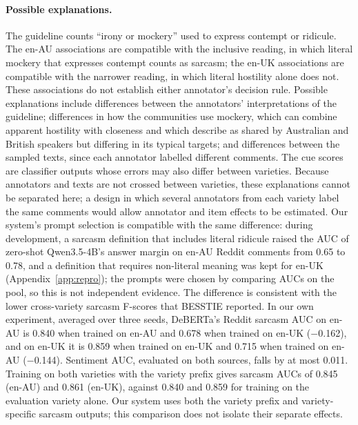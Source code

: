\documentclass[11pt]{article}
\begin{document}
\paragraph{Possible explanations.} The guideline counts ``irony or mockery'' used to express contempt or ridicule. The
en-AU associations are compatible with the inclusive reading, in which literal mockery that expresses contempt counts as
sarcasm; the en-UK associations are compatible with the narrower reading, in which literal hostility alone does not.
These associations do not establish either annotator's decision rule. Possible explanations include differences between
the annotators' interpretations of the guideline; differences in how the communities use mockery, which can combine
apparent hostility with closeness and which \citet{haugh2012mock} describe as shared by Australian and British speakers
but differing in its typical targets; and differences between the sampled texts, since each
annotator labelled different comments. The cue scores are classifier outputs whose errors may also differ between
varieties. Because annotators and texts are not crossed between varieties, these explanations cannot be separated here;
a design in which several annotators from each variety label the same comments would allow annotator and item effects
to be estimated. Our system's prompt selection is compatible with the same difference: during development, a sarcasm
definition that includes literal ridicule raised the AUC of zero-shot Qwen3.5-4B's answer margin on en-AU Reddit
comments from 0.65 to 0.78, and a definition that requires non-literal meaning was kept for en-UK
(Appendix~\ref{app:repro}); the prompts were chosen by comparing AUCs on the pool, so this is not independent evidence. The difference is consistent with the lower cross-variety sarcasm
F-scores that BESSTIE reported. In our own experiment, averaged over three seeds, DeBERTa's Reddit sarcasm AUC on
en-AU is 0.840 when trained on en-AU and 0.678 when trained on en-UK ($-$0.162), and on en-UK it is 0.859 when trained
on en-UK and 0.715 when trained on en-AU ($-$0.144). Sentiment AUC, evaluated on both sources, falls by at most 0.011.
Training on both varieties with the variety prefix gives sarcasm AUCs of 0.845 (en-AU) and 0.861 (en-UK), against 0.840
and 0.859 for training on the evaluation variety alone. Our system uses both the variety prefix and variety-specific
sarcasm outputs; this comparison does not isolate their separate effects.
\end{document}

